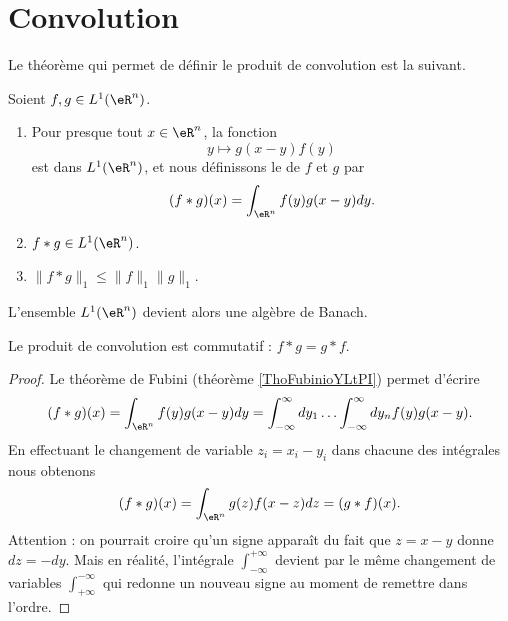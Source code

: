 \section{Convolution}

Le théorème qui permet de définir le produit de convolution est la suivant.

\begin{theoremDef}     \label{THOooMLNMooQfksn}
    Soient \( f,g\in L^1(\eR^n)\).
    \begin{enumerate}
        \item
            Pour presque tout \( x\in \eR^n\), la fonction
            \begin{equation}
                y\mapsto g(x-y)f(y)
            \end{equation}
            est dans \( L^1(\eR^n)\), et nous définissons le  de \( f\) et \( g\) par
            \begin{equation}
                (f*g)(x)=\int_{\eR^n} f(y)g(x-y)dy.
            \end{equation}
        \item
            \( f*g\in L^1(\eR^n)\).
        \item
            \( \| f*g \|_1\leq \| f \|_1\| g \|_1\).
    \end{enumerate}
\end{theoremDef}

L'ensemble \( L^1(\eR^n)\) devient alors une algèbre de Banach.

\begin{lemma}
    Le produit de convolution est commutatif : \( f*g=g*f\).
\end{lemma}

\begin{proof}
    Le théorème de Fubini (théorème \ref{ThoFubinioYLtPI}) permet d'écrire
    \begin{equation}
        (f*g)(x)=\int_{\eR^n}f(y)g(x-y)dy=\int_{-\infty}^{\infty}dy_1\ldots \int_{-\infty}^{\infty}dy_nf(y)g(x-y).
    \end{equation}
    En effectuant le changement de variable \( z_i=x_i-y_i\) dans chacune des intégrales nous obtenons
    \begin{equation}
        (f*g)(x)=\int_{\eR^n}g(z)f(x-z)dz=(g*f)(x).
    \end{equation}
    Attention : on pourrait croire qu'un signe apparaît du fait que \( z=x-y\) donne \( dz=-dy\). Mais en réalité, l'intégrale \( \int_{-\infty}^{+\infty}\) devient par le même changement de variables \( \int_{+\infty}^{-\infty}\) qui redonne un nouveau signe au moment de remettre dans l'ordre.
\end{proof}

